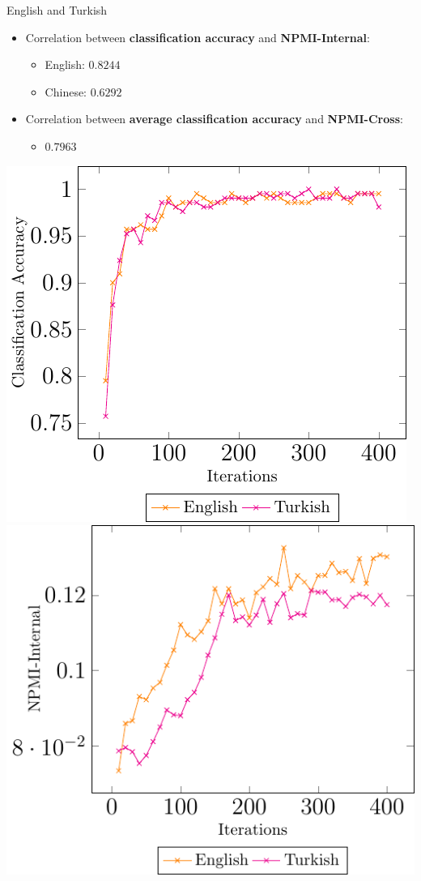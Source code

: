 \documentclass[compress]{beamer}
\begin{document}
	\begin{frame}{English and Turkish}
		\begin{itemize}
			\item Correlation between \textbf{classification accuracy} and \textbf{NPMI-Internal}:
			\begin{itemize}
				\item English: $0.8244$
				\item Chinese: $0.6292$
			\end{itemize}
			\item Correlation between \textbf{average classification accuracy} and \textbf{NPMI-Cross}:
			\begin{itemize}
				\item $0.7963$
			\end{itemize}			
		\end{itemize}
		\begin{center}
			\includegraphics[height=0.5\textheight]{multilingual_itm/clf-en-tr.pdf}
			\includegraphics[height=0.5\textheight]{multilingual_itm/npmi-en-tr.pdf}
		\end{center}
	\end{frame}	
\end{document}
